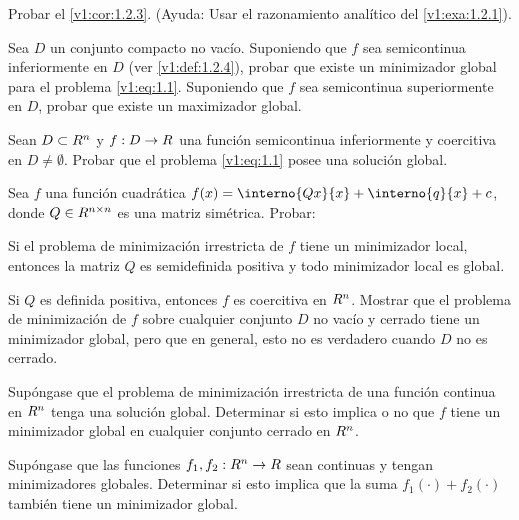 \begin{exercise}\label{v1:ejer:1.6}
 Probar el \cref{v1:cor:1.2.3}. (Ayuda: Usar el razonamiento analítico del \cref{v1:exa:1.2.1}).
\end{exercise}

\begin{exercise}\label{v1:ejer:1.7}
 Sea $D$ un conjunto compacto no vacío. Suponiendo que $f$ sea semicontinua inferiormente en $D$ (ver \cref{v1:def:1.2.4}), probar que existe un minimizador global para el problema \eqref{v1:eq:1.1}. Suponiendo que $f$ sea semicontinua superiormente en $D$, probar que existe un maximizador global.
\end{exercise}

\begin{exercise}\label{v1:ejer:1.8}
 Sean $D \subset R^n$ y $f : D \to R$ una función semicontinua inferiormente y coercitiva en $D \neq \emptyset$. Probar que el problema \eqref{v1:eq:1.1} posee una solución global.
\end{exercise}

\begin{exercise}\label{v1:ejer:1.9}
 Sea $f$ una función cuadrática $f(x) = \interno{Qx}{x} + \interno{q}{x} + c$, donde $Q \in R^{n \times n}$ es una matriz simétrica. Probar:
 \begin{enuthm}
 \item Si el problema de minimización irrestricta de $f$ tiene un minimizador local, entonces la matriz $Q$ es semidefinida positiva y todo minimizador local es global.
 \item Si $Q$ es definida positiva, entonces $f$ es coercitiva en $R^n$. Mostrar que el problema de minimización de $f$ sobre cualquier conjunto $D$ no vacío y cerrado tiene un minimizador global, pero que en general, esto no es verdadero cuando $D$ no es cerrado.
 \end{enuthm}
\end{exercise}

\begin{exercise}\label{v1:ejer:1.10}
 Supóngase que el problema de minimización irrestricta de una función continua en $R^n$ tenga una solución global. Determinar si esto implica o no que $f$ tiene un minimizador global en cualquier conjunto cerrado en $R^n$.
\end{exercise}

\begin{exercise}\label{v1:ejer:1.11}
 Supóngase que las funciones $f_1, f_2 : R^n \to R$ sean continuas y tengan minimizadores globales. Determinar si esto implica que la suma $f_1(\cdot) + f_2(\cdot)$ también tiene un minimizador global.
\end{exercise}

